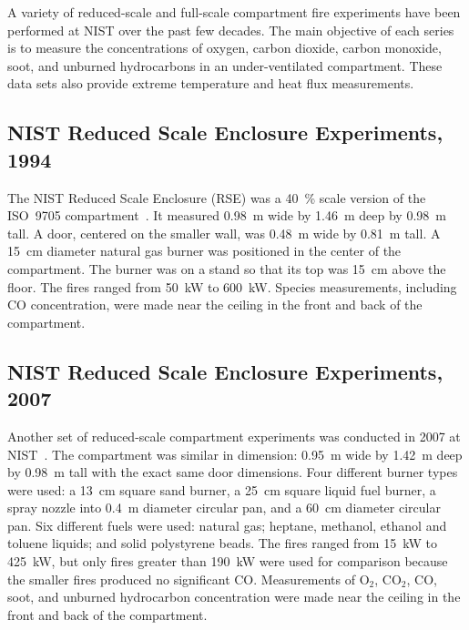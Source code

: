 A variety of reduced-scale and full-scale compartment fire experiments have been performed at NIST over the past few decades. The main objective of each series is to measure the concentrations of oxygen, carbon dioxide, carbon monoxide, soot, and unburned hydrocarbons in an under-ventilated compartment. These data sets also provide extreme temperature and heat flux measurements.

\subsection{NIST Reduced Scale Enclosure Experiments, 1994}
\label{NIST_RSE_1994_Description}

The NIST Reduced Scale Enclosure (RSE) was a 40~\% scale version of the ISO~9705 compartment~\cite{Bryner:1}. It measured 0.98~m wide by 1.46~m deep by 0.98~m tall. A door, centered on the smaller wall, was 0.48~m wide by 0.81~m tall.  A 15~cm diameter natural gas burner was positioned in the center of the compartment.  The burner was on a stand so that its top was 15~cm above the floor. The fires ranged from 50~kW to 600~kW. Species measurements, including CO concentration, were made near the ceiling in the front and back of the compartment.

\subsection{NIST Reduced Scale Enclosure Experiments, 2007}
\label{NIST_RSE_2007_Description}

Another set of reduced-scale compartment experiments was conducted in 2007 at NIST~\cite{Bundy:1}. The compartment was similar in dimension: 0.95~m wide by 1.42~m deep by 0.98~m tall with the exact same door dimensions. Four different burner types were used: a 13~cm square sand burner, a 25~cm square liquid fuel burner, a spray nozzle into 0.4~m diameter circular pan, and a 60~cm diameter circular pan. Six different fuels were used: natural gas; heptane, methanol, ethanol and toluene liquids; and solid polystyrene beads. The fires ranged from 15~kW to 425~kW, but only fires greater than 190~kW were used for comparison because the smaller fires produced no significant CO. Measurements of O$_2$, CO$_2$, CO, soot, and unburned hydrocarbon concentration were made near the ceiling in the front and back of the compartment.

